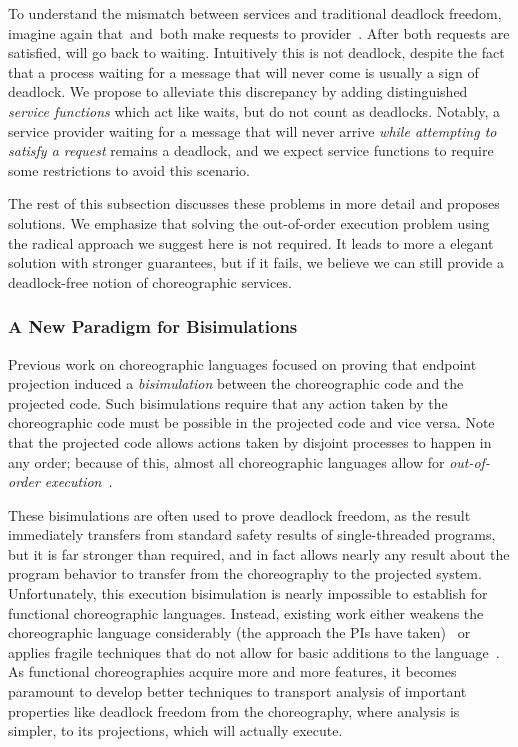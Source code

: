 To understand the mismatch between services and traditional deadlock freedom, imagine again that~\Alice and~\Bob both make requests to provider~\Server.
After both requests are satisfied, \Server{} will go back to waiting.
Intuitively this is not deadlock, despite the fact that a process waiting for a message that will never come is usually a sign of deadlock.
We propose to alleviate this discrepancy by adding distinguished \emph{service functions} which act like waits, but do not count as deadlocks.
Notably, a service provider waiting for a message that will never arrive \emph{while attempting to satisfy a request}
remains a deadlock, and we expect service functions to require some restrictions to avoid this scenario.

The rest of this subsection discusses these problems in more detail and proposes solutions.
We emphasize that solving the out-of-order execution problem using the radical approach we suggest here is not required.
It leads to more a elegant solution with stronger guarantees, but if it fails, we believe we can still provide a deadlock-free notion of choreographic services.

\subsubsection{A New Paradigm for Bisimulations}
\label{sec:new-parad-bisim}

Previous work on choreographic languages focused on proving that endpoint projection induced a \emph{bisimulation} between the choreographic code and the projected code.
Such bisimulations require that any action taken by the choreographic code must be possible in the projected code and vice versa.
Note that the projected code allows actions taken by disjoint processes to happen in any order; because of this, almost all choreographic languages allow for \emph{out-of-order execution}~\cite{Montesi23,HirschG22,Cruz-FilipeM17}.

These bisimulations are often used to prove deadlock freedom, as the result immediately transfers from standard safety results of single-threaded programs,
but it is far stronger than required, and in fact allows nearly any result about the program behavior to transfer from the choreography to the projected system.
Unfortunately, this execution bisimulation is nearly impossible to establish for functional choreographic languages.
Instead, existing work either weakens the choreographic language considerably (the approach the PIs have taken)~\cite{HirschG22,SamuelsonHC25} or applies fragile techniques that do not allow for basic additions to the language~\cite{CruzFilipeGLMP23}.
As functional choreographies acquire more and more features, it becomes paramount to develop better techniques
to transport analysis of important properties like deadlock freedom from the choreography, where analysis is simpler,
to its projections, which will actually execute.

